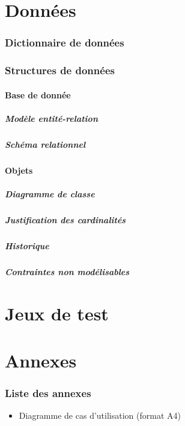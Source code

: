 \documentclass[10pt,a4paper]{article}
\begin{document}
	\part{Données}
		\section{Dictionnaire de données}
			
		\section{Structures de données}
			\subsection{Base de donnée}
				\subsubsection{Modèle entité-relation}
				\subsubsection{Schéma relationnel}
			\subsection{Objets}
				\subsubsection{Diagramme de classe}
				\subsubsection{Justification des cardinalités}
				\subsubsection{Historique}
				\subsubsection{Contraintes non modélisables}
	\newpage
	\part{Jeux de test}
	\newpage
	\part{Annexes}
		\section{Liste des annexes}
		\begin{itemize}
			\item Diagramme de cas d'utilisation (format A4)
		\end{itemize}
\end{document}
